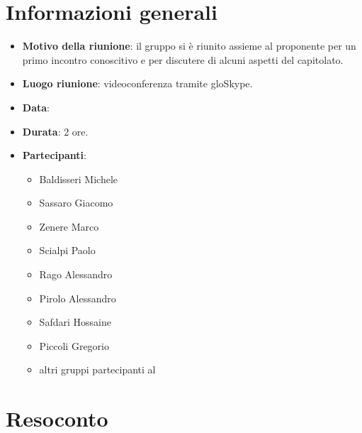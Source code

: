 \section{Informazioni generali}
\begin{itemize}
\item \textbf{Motivo della riunione}: il gruppo si è riunito assieme al proponente per un primo incontro conoscitivo e per discutere di alcuni aspetti del capitolato.
\item \textbf{Luogo riunione}: videoconferenza tramite glo{Skype}.
\item \textbf{Data}: \Data{}
\item \textbf{Durata}: 2 ore.
\item \textbf{Partecipanti}:
	\begin{itemize}
	\item Baldisseri Michele
	\item Sassaro Giacomo
	\item Zenere Marco
	\item Scialpi Paolo
	\item Rago Alessandro
	\item Pirolo Alessandro
	\item Safdari Hossaine
	\item Piccoli Gregorio
	\item altri gruppi partecipanti al 
	\end{itemize}
\end{itemize}
\newpage
\section{Resoconto}
\begin{itemize}



\end{itemize}